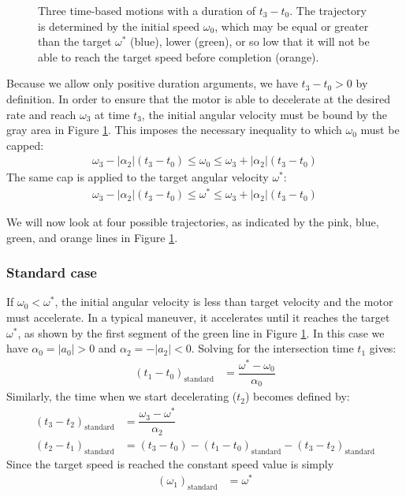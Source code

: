 \documentclass[12pt, a4paper]
{article}
\providecommand{\lr}[1]{\left(#1\right)}
\providecommand{\sub}[1]{_{\text{#1}}}
\providecommand{\w}{\omega}
\providecommand{\wt}{\w^*}
\renewcommand{\a}{\alpha}
\providecommand{\abs}[1]{\left|#1\right|}
\begin{document}
\begin{figure}[H]
    \centering
    
    \caption{
        Three time-based motions with a duration of $t_3-t_0$.
        The trajectory is determined by the initial speed $\w_0$,
        which may be equal or greater than the
        target $\wt$ (blue), lower (green), or so low that it will not be able
        to reach the target speed before completion (orange).\label{fig:time}}
\end{figure}

Because we allow only positive duration arguments, we have $t_3-t_0 > 0$ by
definition. In order to ensure that the motor is able to decelerate at the
desired rate and reach $\w_3$ at time $t_3$, the initial angular velocity must
be bound by the gray area in Figure \ref{fig:time}. This imposes the necessary
inequality to which $\w_0$ must be capped:
%
\begin{align}
    \label{eq:t:timeboundary1}
    \w_3 - \abs{\a_2} \lr{t_3-t_0} \leq \w_0 \leq \w_3 + \abs{\a_2}\lr{t_3-t_0}
\end{align}
%
The same cap is applied to the target angular velocity $\wt$:
%
\begin{align}
    \label{eq:t:timeboundary2}
    \w_3 - \abs{\a_2} \lr{t_3-t_0} \leq \wt \leq \w_3 + \abs{\a_2} \lr{t_3-t_0}
\end{align}

We will now look at four possible trajectories, as indicated by the pink, blue,
green, and orange lines in Figure \ref{fig:time}.

\subsubsection{Standard case}
\label{sec:t:standard}
If $\w_0 < \wt$, the initial angular velocity is less than target velocity and
the motor must accelerate. In a typical maneuver, it accelerates
until it reaches the target $\wt$, as shown by the first segment of the green
line in Figure \ref{fig:time}.
In this case we have $\a_0 = \abs{a_0} > 0$ and $\a_2 = -\abs{a_2} < 0$.
Solving for the intersection time $t_1$ gives:
%
\begin{align}
    \label{eq:t:t1mt0:standard}
    \lr{t_1 - t_0}\sub{standard} &= \dfrac{\wt-\w_0}{\a_0}
\end{align}
%
Similarly, the time when we start decelerating ($t_2$) becomes defined by:
%
\begin{align}
    \label{eq:t:t3mt2:standard}
    \lr{t_3 - t_2}\sub{standard} &= \dfrac{\w_3-\wt}{\a_2}\\[1em]
    \label{eq:t:t2mt1:standard}
    \lr{t_2 - t_1}\sub{standard} &=
        (t_3-t_0) - \lr{t_1 - t_0}\sub{standard} - \lr{t_3 - t_2}\sub{standard}
\end{align}
%
Since the target speed is reached the constant speed value is simply
\begin{align}
    \lr{\w_1}\sub{standard} &= \wt
\end{align}
\end{document}
